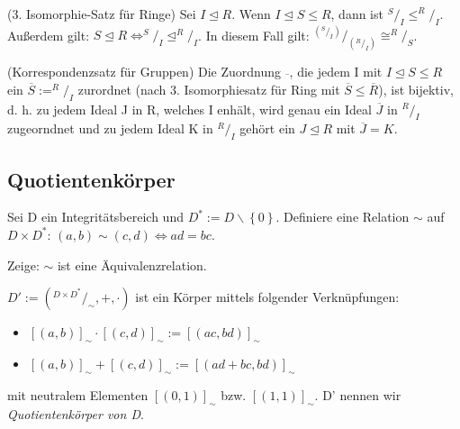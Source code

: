 \documentclass[10pt]{scrbook}
\begin{document}
\begin{Sa}
(3. Isomorphie-Satz für Ringe)
Sei $I\trianglelefteq R$. Wenn $I\trianglelefteq S\leq R$, dann ist $^S/_I\leq ^R/_I$. Außerdem gilt: $S \trianglelefteq R\Leftrightarrow ^S/_I\trianglelefteq ^R/_I$. In diesem Fall gilt: $^{\left(^S/_I\right)}/_{\left(^R/_I\right)}\cong ^R/_S$.
\end{Sa}

\begin{Sa}
(Korrespondenzsatz für Gruppen)
Die Zuordnung $\overline{\ }$, die jedem I mit $I\trianglelefteq S\leq R$ ein $\overline{S}:=^R/_I$ zurordnet (nach 3. Isomorphiesatz für Ring mit $\overline{S}\leq \overline{R}$), ist bijektiv, d. h. zu jedem Ideal J in R, welches I enhält, wird genau ein Ideal $\overline{J}$ in $^R/_I$ zugeorndnet und zu jedem Ideal K in $^R/_I$ gehört ein $J\trianglelefteq R$ mit $\overline{J}=K$.
\end{Sa}

\subsection{Quotientenkörper}

\begin{Def}
Sei D ein Integritätsbereich und $D^*:=D\backslash \left\{0\right\}$. Definiere eine Relation $\sim$ auf $D\times D^*$: $(a, b)\sim (c,d)\Leftrightarrow a d=b c $.
\end{Def}

\begin{Auf}
Zeige: $\sim$ ist eine Äquivalenzrelation.
\end{Auf}

\begin{Sa}
$D':=({}^{D\times D^*}/_\sim, +, \cdot)$ ist ein Körper mittels folgender Verknüpfungen:
\begin{itemize}
	\item $\left[\left(a, b\right)\right]_\sim \cdot \left[\left(c, d\right)\right]_\sim:=\left[\left(a c, b d\right)\right]_\sim$
	\item $\left[\left(a, b\right)\right]_\sim + \left[\left(c, d\right)\right]_\sim:=\left[\left(a d+ b c, b d\right)\right]_\sim$
\end{itemize}
mit neutralem Elementen $\left[(0, 1)\right]_\sim$ bzw. $\left[(1, 1)\right]_\sim$. D' nennen wir \emph{Quotientenkörper von D}.
\end{Sa}
\end{document}
